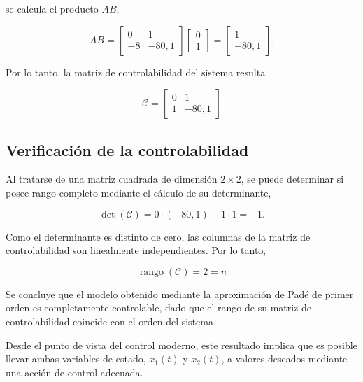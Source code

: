 \documentclass[10pt]{article}
\begin{document}
se calcula el producto $AB$,

\begin{equation}
    AB=
    \begin{bmatrix}
        0 & 1\\
        -8 & -80{,}1
    \end{bmatrix}
    \begin{bmatrix}
        0\\
        1
    \end{bmatrix}
    =
    \begin{bmatrix}
        1\\
        -80{,}1
    \end{bmatrix}.
\end{equation}

Por lo tanto, la matriz de controlabilidad del sistema
resulta

\begin{equation}
    \boxed{
        \mathcal{C}=
        \begin{bmatrix}
            0 & 1\\
            1 & -80{,}1
        \end{bmatrix}
    }
\end{equation}


\subsection{Verificación de la controlabilidad}

Al tratarse de una matriz cuadrada de dimensión
$2\times2$, se puede determinar si posee rango completo
mediante el cálculo de su determinante,

\begin{equation}
    \det(\mathcal{C})=
    0\cdot(-80{,}1)-1\cdot1=-1.
\end{equation}

Como el determinante es distinto de cero, las columnas
de la matriz de controlabilidad son linealmente
independientes. Por lo tanto,

\begin{equation}
    \boxed{
        \operatorname{rango}(\mathcal{C})=2=n
    }
\end{equation}

Se concluye que el modelo obtenido mediante la aproximación
de Padé de primer orden es completamente controlable,
dado que el rango de su matriz de controlabilidad
coincide con el orden del sistema.

Desde el punto de vista del control moderno, este
resultado implica que es posible llevar ambas variables
de estado, $x_1(t)$ y $x_2(t)$, a valores deseados mediante
una acción de control adecuada.
\end{document}
